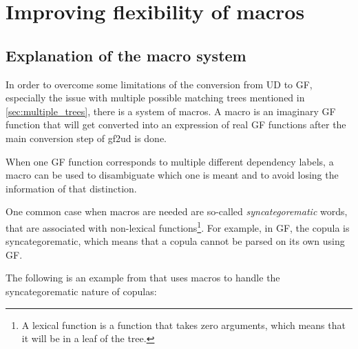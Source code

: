 \chapter{Improving flexibility of macros}\label{sect:flex}
\label{improving-flexibility-macros}


\section{Explanation of the macro system}


In order to overcome some limitations of the conversion from UD to GF, especially the issue with multiple possible matching trees mentioned in \autoref{sec:multiple_trees}, there is a system of macros. A macro is an imaginary GF function that will get converted into an expression of real GF functions after the main conversion step of gf2ud is done.


When one GF function corresponds to multiple different dependency labels, a macro can be used to disambiguate which one is meant and to avoid losing the information of that distinction.

One common case when macros are needed are so-called \emph{syncategorematic} words, that are associated with non-lexical functions\footnote{A lexical function is a function that takes zero arguments, which means that it will be in a leaf of the tree.}. For example, in GF, the copula is syncategorematic, which means that a copula cannot be parsed on its own using GF.

The following is an example from \cite{kolachina-ranta-2017} that uses macros to handle the syncategorematic nature of copulas:


